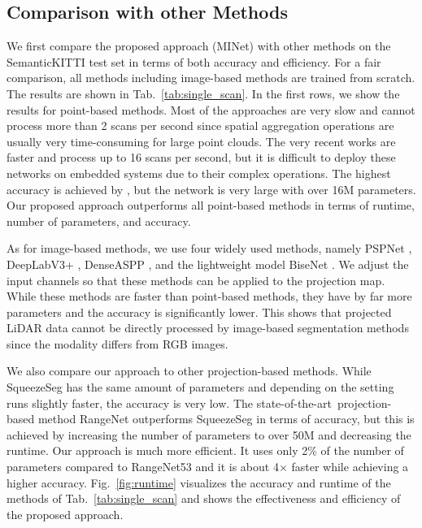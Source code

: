 \documentclass[letterpaper, 10 pt, journal, twoside]{ieeetran}
\newcommand{\figref}[1]{Fig.~\ref{#1}}
\newcommand{\tabref}[1]{Tab.~\ref{#1}}
\def\sArt{{state-of-the-art~}}
\newcommand{\todo}[1]{#1}
\begin{document}
\subsection{Comparison with other Methods}
We first compare the proposed approach (MINet) with other methods on the SemanticKITTI test set in terms of both accuracy and efficiency.
\todo{For a fair comparison, all methods including image-based methods are trained from scratch.}
The results are shown in \tabref{tab:single_scan}. In the first rows, we show the results for point-based methods. Most of the approaches are very slow and cannot process more than 2 scans per second since spatial aggregation operations are usually very time-consuming for large point clouds. 
The very recent works \cite{li2020projected,hu2019randla,zhang2020polarnet} are faster and process up to 16 scans per second, but it is difficult to deploy these networks on embedded systems due to their complex operations. The highest accuracy is achieved by \cite{zhang2020polarnet}, but the network is very large with over 16M parameters. Our proposed approach outperforms all point-based methods in terms of runtime, number of parameters, and accuracy. 






As for image-based methods, we use four widely used methods, namely PSPNet \cite{zhao2017pyramid}, DeepLabV3+ \cite{chen2018encoder}, DenseASPP \cite{yang2018denseaspp}, and the lightweight model BiseNet \cite{yu2018bisenet}.
We adjust the input channels so that these methods can be applied to the projection map.
While these methods are faster than point-based methods, they have by far more parameters and the accuracy is significantly lower. This shows that projected LiDAR data cannot be directly processed by image-based segmentation methods since the modality differs from RGB images. 

We also compare our approach to other projection-based methods. While SqueezeSeg \cite{wu2018squeezeseg, wu2019squeezesegv2} has the same amount of parameters and depending on the setting runs slightly faster, the accuracy is very low. The \sArt projection-based method RangeNet \cite{milioto2019rangenet++} outperforms SqueezeSeg in terms of accuracy, but this is achieved by increasing the number of parameters to over 50M and decreasing the runtime. Our approach is much more efficient. It uses only 2\% of the number of parameters compared to RangeNet53 and it is about 4$\times$ faster while achieving a higher accuracy. \figref{fig:runtime} visualizes the accuracy and runtime of the methods of \tabref{tab:single_scan} and shows the effectiveness and efficiency of the proposed approach.  
\end{document}
